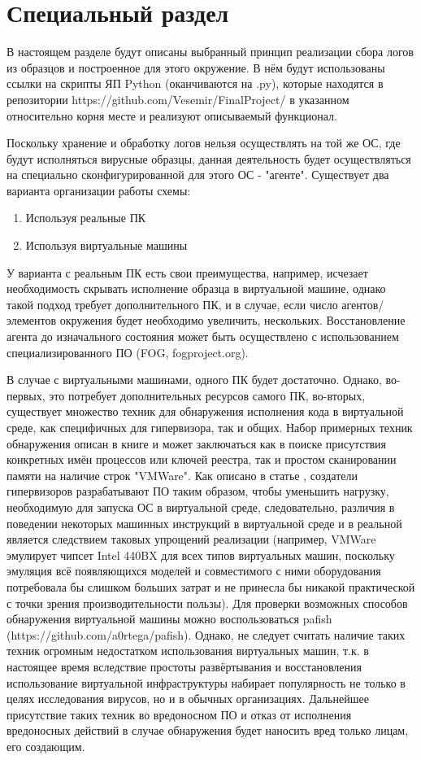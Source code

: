 \section {Специальный раздел}
В настоящем разделе будут описаны выбранный принцип реализации сбора логов из образцов и построенное для этого окружение. В нём будут использованы ссылки на скрипты ЯП Python (оканчиваются на .py), которые находятся в репозитории https://github.com/Vesemir/FinalProject/  в указанном относительно корня месте и реализуют описываемый функционал.

Поскольку хранение и обработку логов нельзя осуществлять на той же ОС, где будут исполняться вирусные образцы, данная деятельность будет осуществляться на специально сконфигурированной для этого ОС - "агенте". Существует два варианта организации работы схемы:
\begin {enumerate}
	\item Используя реальные ПК
	\item Используя виртуальные машины
\end {enumerate}
У варианта с реальным ПК есть свои преимущества, например, исчезает необходимость скрывать исполнение
образца в виртуальной машине, однако такой подход требует дополнительного ПК, и в случае,
если число агентов/ элементов окружения будет необходимо увеличить, нескольких. Восстановление агента
до изначального состояния может быть осуществлено с использованием специализированного ПО (FOG, fogproject.org).

В случае с виртуальными машинами, одного ПК будет достаточно. Однако, во-первых, это потребует дополнительных ресурсов самого ПК, во-вторых, существует множество техник для обнаружения исполнения кода в виртуальной среде, как специфичных для гипервизора, так и общих. Набор примерных техник обнаружения описан в  книге \cite{MALWAREANALYSIS} и может заключаться как в поиске присутствия конкретных имён процессов или ключей реестра, так и простом сканировании памяти на наличие строк "VMWare".  Как описано в статье \cite {VMMYTHS}, создатели гипервизоров разрабатывают ПО таким образом, чтобы уменьшить нагрузку,  необходимую для запуска ОС в виртуальной среде, следовательно, различия в поведении некоторых машинных инструкций в виртуальной среде и в реальной является следствием таковых упрощений реализации (например, VMWare эмулирует чипсет Intel 440BX для всех типов виртуальных машин, поскольку эмуляция всё появляющихся моделей и совместимого с ними оборудования потребовала бы слишком больших затрат и не принесла бы никакой практической с точки зрения производительности пользы). Для проверки возможных способов обнаружения виртуальной машины можно воспользоваться pafish (https://github.com/a0rtega/pafish). Однако, не следует считать наличие таких техник огромным недостатком использования виртуальных машин, т.к. в настоящее время вследствие простоты развёртывания и восстановления использование виртуальной инфраструктуры набирает популярность не только в целях исследования вирусов, но и в обычных организациях. Дальнейшее присутствие таких техник во вредоносном ПО и отказ от исполнения вредоносных действий в случае обнаружения будет наносить вред только лицам, его создающим.

